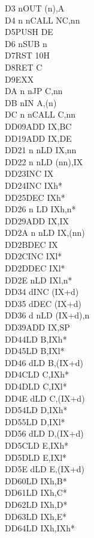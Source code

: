 \documentclass[oneside,a4paper]{book}
\begin{document}
\begin{multicols}{3}
{\begin{tabbing}
D3 n\>OUT (n),A\\
D4 n n\>CALL NC,nn\\
D5\>PUSH DE\\
D6 n\>SUB n\\
D7\>RST 10H\\
D8\>RET C\\
D9\>EXX\\
DA n n\>JP C,nn\\
DB n\>IN A,(n)\\
DC n n\>CALL C,nn\\
DD09\>ADD IX,BC\\
DD19\>ADD IX,DE\\
DD21 n n\>LD IX,nn\\
DD22 n n\>LD (nn),IX\\
DD23\>INC IX\\
DD24\>INC IXh*\\
DD25\>DEC IXh*\\
DD26 n \>LD IXh,n*\\
DD29\>ADD IX,IX\\
DD2A n n\>LD IX,(nn)\\
DD2B\>DEC IX\\
DD2C\>INC IXl*\\
DD2D\>DEC IXl*\\
DD2E n\>LD IXl,n*\\
DD34 d\>INC (IX+d)\\
DD35 d\>DEC (IX+d)\\
DD36 d n\>LD (IX+d),n\\
DD39\>ADD IX,SP\\
DD44\>LD B,IXh*\\
DD45\>LD B,IXl*\\
DD46 d\>LD B,(IX+d)\\
DD4C\>LD C,IXh*\\
DD4D\>LD C,IXl*\\
DD4E d\>LD C,(IX+d)\\
DD54\>LD D,IXh*\\
DD55\>LD D,IXl*\\
DD56 d\>LD D,(IX+d)\\
DD5C\>LD E,IXh*\\
DD5D\>LD E,IXl*\\
DD5E d\>LD E,(IX+d)\\
DD60\>LD IXh,B*\\
DD61\>LD IXh,C*\\
DD62\>LD IXh,D*\\
DD63\>LD IXh,E*\\
DD64\>LD IXh,IXh*\\

\end{tabbing}}
\end{multicols}
\end{document}
